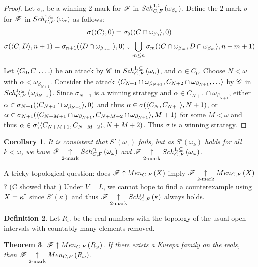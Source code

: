 \documentclass{amsart}
\theoremstyle{plain}
\newtheorem{theorem}{Theorem}
\newtheorem{corollary}[theorem]{Corollary}
\theoremstyle{definition}
\newtheorem{definition}[theorem]{Definition}
\theoremstyle{remark}
\theoremstyle{plain}
\theoremstyle{definition}
\theoremstyle{remark}
\begin{document}
  \begin{proof}
    Let \(\sigma_n\) be a winning \(2\)-mark for \(\mathscr{F}\) in
    \(Sch^{1,\subseteq}_{C,F}\left({\omega_{\beta_n}}\right)\). Define the \(2\)-mark \(\sigma\)
    for \(\mathscr{F}\) in \(Sch^{1,\subseteq}_{C,F}\left({\omega_\alpha}\right)\) as follows:
    \[
      \sigma(\langle C\rangle,0)
        =
      \sigma_0(\langle C\cap\omega_{\beta_0}\rangle,0)
    \]
    \[
      \sigma(\langle C,D\rangle,n+1)
        =
      \sigma_{n+1}(\langle D\cap\omega_{\beta_{n+1}}\rangle,0)
        \cup
      \bigcup_{m\leq n}
      \sigma_m(\langle C\cap\omega_{\beta_m},D\cap\omega_{\beta_m}\rangle,n-m+1)
    \]

    Let \(\<C_0,C_1,\dots\>\) be an attack by
    \(\mathscr{C}\) in \(Sch^{1,\subseteq}_{C,F}\left({\omega_\alpha}\right)\), and
    \(\alpha\in C_0\).
    Choose \(N<\omega\) with \(\alpha<\omega_{\beta_{N+1}}\). Consider the
    attack
    \(\<C_{N+1}\cap\omega_{\beta_{N+1}},C_{N+2}\cap\omega_{\beta_{N+1}},\dots\>\)
    by \(\mathscr{C}\) in \(Sch^{1,\subseteq}_{C,F}\left({\omega_{\beta_{N+1}}}\right)\). Since
    \(\sigma_{N+1}\) is a winning strategy and
    \(\alpha\in C_{N+1}\cap\omega_{\beta_{N+1}}\), either
    \(\alpha\in\sigma_{N+1}(\langle C_{N+1}\cap\omega_{\beta_{N+1}}\rangle,0)\) and thus
    \(\alpha\in\sigma(\langle C_N,C_{N+1}\rangle,N+1)\), or
    \(
      \alpha
        \in
      \sigma_{N+1}(
        \langle C_{N+M+1}\cap\omega_{\beta_{N+1}},C_{N+M+2}\cap\omega_{\beta_{N+1}}\rangle
        ,M+1
      )
    \)
    for some \(M<\omega\) and thus
    \(
      \alpha
        \in
      \sigma(
        \langle C_{N+M+1},C_{N+M+2}\rangle,
        N+M+2
      )
    \). Thus \(\sigma\) is a winning strategy.
  \end{proof}

  \begin{corollary}
    It is consistent that \(S'(\omega_\omega)\) fails,
    but as \(S'(\omega_k)\) holds for all \(k<\omega\), we have
    \(\mathscr{F}\underset{2\text{-mark}}{\uparrow}Sch^{\cap}_{C,F}\left({\omega_\omega}\right)\) and
    \(\mathscr{F}\underset{2\text{-mark}}{\uparrow}Sch^{1,\subseteq}_{C,F}\left({\omega_\omega}\right)\).
  \end{corollary}

  A tricky topological question: does \(\mathscr{F}\uparrow Men_{C,F}\left({X}\right)\) imply
  \(\mathscr{F}\underset{2\text{-mark}}{\uparrow}Men_{C,F}\left({X}\right)\)?
  (C showed that )
  Under \(V=L\), we cannot hope to find
  a counterexample using \(X=\kappa^\dagger\) since
  \(S'(\kappa)\) and thus \(\mathscr{F}\underset{2\text{-mark}}{\uparrow}Sch^{\cap}_{C,F}\left({\kappa}\right)\)
  always holds.

  \begin{definition}
    Let \(R_\omega\) be the real numbers with the topology of the usual
    open intervals with countably many elements removed.
  \end{definition}

  \begin{theorem}
    \(\mathscr{F}\uparrow Men_{C,F}\left({R_\omega}\right)\).
    If there exists a Kurepa family on the reals, then
    \(\mathscr{F}\underset{2\text{-mark}}{\uparrow}Men_{C,F}\left({R_\omega}\right)\).
  \end{theorem}



\end{document}

